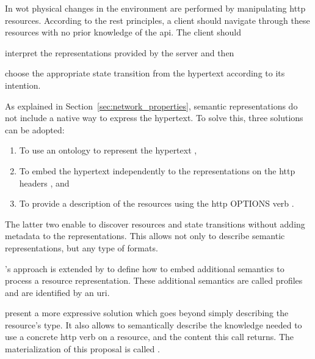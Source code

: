 In \ac{wot} physical changes in the environment are performed by manipulating \ac{http} resources.
According to the \ac{rest} principles, a client should navigate through these resources with no prior knowledge of the \ac{api}.
The client should 
\begin{enumerate*}[label=\itshape(\arabic*\upshape)]
  \item interpret the representations provided by the server and then
  \item choose the appropriate state transition from the hypertext according to its intention. %
\end{enumerate*}


As explained in Section~\ref{sec:network_properties}, semantic representations do not include a native way to express the hypertext. %
To solve this, three solutions can be adopted:
\begin{enumerate}
  \item To use an ontology to represent the hypertext \citep{kjernsmo_necessity_2012},
  \item To embed the hypertext independently to the representations on the \ac{http} headers \citep{mark_web_2010}, and
  \item To provide a description of the resources using the \ac{http} OPTIONS verb \citep{verborgh_functional_2012,verborgh_ijcs_2014}.
\end{enumerate}

The latter two enable to discover resources and state transitions without adding metadata to the representations.
This allows not only to describe semantic representations, but any type of formats.

\citeauthor{mark_web_2010}'s \citep{mark_web_2010} approach is extended by \citet{erik_profile_2013} to define how to embed additional semantics to process a resource representation.
These additional semantics are called profiles and are identified by an \acs{uri}.


\bigskip


\citet{verborgh_ijcs_2014} present a more expressive solution which goes beyond simply describing the resource's type.
It also allows to semantically describe the knowledge needed to use a concrete \acs{http} verb on a resource, and the content this call returns. %
The materialization of this proposal is called \restdesc{} \citep{verborgh_functional_2012}.


